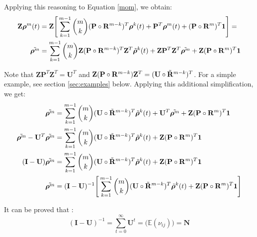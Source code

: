 \documentclass[\main/main.tex]{subfiles}
\begin{document}
Applying this reasoning to Equation \ref{mom}, we obtain:
\begin{equation}\label{mom2}
\begin{split}
     \mathbf{Z}\bm{\rho}^m(t) &= \mathbf{Z} \Bigg[ 
     \sum_{k=1}^{m-1} {m \choose k} (\mathbf{P} \circ \mathbf{R}^{m-k}) ^ T \bm{\rho}^k(t) +
     \mathbf{P} ^ T \bm{\rho}^m(t) + (\mathbf{P} \circ \mathbf{R}^{m}) ^ T \bm{1}\Bigg] = \\
     \Tilde{\bm{\rho}^m} &= \sum_{k=1}^{m-1} {m \choose k}\mathbf{Z}  (\mathbf{P} \circ \mathbf{R}^{m-k}) ^ T\mathbf{Z}^T \Tilde{\bm{\rho}}^k(t) + \mathbf{Z} \mathbf{P}^T \mathbf{Z}^T \Tilde{\bm{\rho}^m}  + \mathbf{Z} (\mathbf{P} \circ \mathbf{R}^{m}) ^ T \bm{1}
\end{split}
    \end{equation}
    
    
Note that $\mathbf{Z} \mathbf{P}^T \mathbf{Z}^T = \mathbf{U}^T $ and $ \mathbf{Z} (\mathbf{P} \circ \mathbf{R}^{m-k})\mathbf{Z}^T  = (\mathbf{U} \circ \Tilde{\mathbf{R}}^{m-k}) ^T $. For a simple example, see section \ref{sec:examples} below. Applying this additional simplification, we get:
\begin{equation}\label{mom2}
\begin{split}
     \Tilde{\bm{\rho}^m} &= \sum_{k=1}^{m-1} {m \choose k}(\mathbf{U} \circ \Tilde{\mathbf{R}}^{m-k}) ^T \Tilde{\bm{\rho}}^k(t) + \mathbf{U}^T \Tilde{\bm{\rho}^m}  + \mathbf{Z} (\mathbf{P} \circ \mathbf{R}^{m}) ^ T \bm{1}\\
     \Tilde{\bm{\rho}^m} -\mathbf{U}^T \Tilde{\bm{\rho}^m} &= \sum_{k=1}^{m-1} {m \choose k}(\mathbf{U} \circ \Tilde{\mathbf{R}}^{m-k}) ^T \Tilde{\bm{\rho}}^k(t) + \mathbf{Z} (\mathbf{P} \circ \mathbf{R}^{m}) ^ T \bm{1}  \\
     (\mathbf{I} - \mathbf{U}) \Tilde{\bm{\rho}^m} &= \sum_{k=1}^{m-1} {m \choose k}(\mathbf{U} \circ \Tilde{\mathbf{R}}^{m-k}) ^T \Tilde{\bm{\rho}}^k(t) + \mathbf{Z} (\mathbf{P} \circ \mathbf{R}^{m}) ^ T \bm{1}  \\
     \Tilde{\bm{\rho}^m} &= (\mathbf{I} - \mathbf{U})^{-1} \Bigg[ \sum_{k=1}^{m-1} {m \choose k}(\mathbf{U} \circ \Tilde{\mathbf{R}}^{m-k}) ^T \Tilde{\bm{\rho}}^k(t) + \mathbf{Z} (\mathbf{P} \circ \mathbf{R}^{m}) ^ T \bm{1} \Bigg]
\end{split}
    \end{equation}

It can be proved that \citep{Caswell2009}:
\begin{equation}
    (\mathbf{I} - \mathbf{U})^{-1} = \sum_{t=0}^\infty \mathbf{U}^t = \big( \mathds{E} (\nu_{ij}) \big) = \mathbf{N}
\end{equation}
\end{document}
